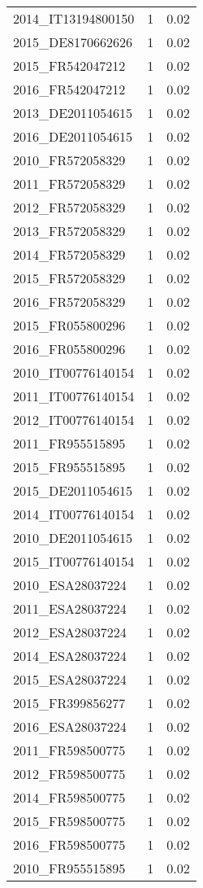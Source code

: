 \begin{table*}[htbp]
\begin{tabular}{lrr}
2014_IT13194800150 & 1 & 0.02 \\
2015_DE8170662626 & 1 & 0.02 \\
2015_FR542047212 & 1 & 0.02 \\
2016_FR542047212 & 1 & 0.02 \\
2013_DE2011054615 & 1 & 0.02 \\
2016_DE2011054615 & 1 & 0.02 \\
2010_FR572058329 & 1 & 0.02 \\
2011_FR572058329 & 1 & 0.02 \\
2012_FR572058329 & 1 & 0.02 \\
2013_FR572058329 & 1 & 0.02 \\
2014_FR572058329 & 1 & 0.02 \\
2015_FR572058329 & 1 & 0.02 \\
2016_FR572058329 & 1 & 0.02 \\
2015_FR055800296 & 1 & 0.02 \\
2016_FR055800296 & 1 & 0.02 \\
2010_IT00776140154 & 1 & 0.02 \\
2011_IT00776140154 & 1 & 0.02 \\
2012_IT00776140154 & 1 & 0.02 \\
2011_FR955515895 & 1 & 0.02 \\
2015_FR955515895 & 1 & 0.02 \\
2015_DE2011054615 & 1 & 0.02 \\
2014_IT00776140154 & 1 & 0.02 \\
2010_DE2011054615 & 1 & 0.02 \\
2015_IT00776140154 & 1 & 0.02 \\
2010_ESA28037224 & 1 & 0.02 \\
2011_ESA28037224 & 1 & 0.02 \\
2012_ESA28037224 & 1 & 0.02 \\
2014_ESA28037224 & 1 & 0.02 \\
2015_ESA28037224 & 1 & 0.02 \\
2015_FR399856277 & 1 & 0.02 \\
2016_ESA28037224 & 1 & 0.02 \\
2011_FR598500775 & 1 & 0.02 \\
2012_FR598500775 & 1 & 0.02 \\
2014_FR598500775 & 1 & 0.02 \\
2015_FR598500775 & 1 & 0.02 \\
2016_FR598500775 & 1 & 0.02 \\
2010_FR955515895 & 1 & 0.02 \\

\end{tabular}
\end{table*}
